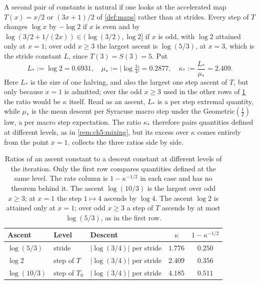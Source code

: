 A second pair of constants is natural if one looks at the accelerated map
$T(x)=x/2$ or $(3x+1)/2$ of \cref{def:maps} rather than at strides.  Every step
of $T$ changes $\log x$ by $-\log 2$ if $x$ is even and by
$\log(3/2+1/(2x))\in(\log(3/2),\log2]$ if $x$ is odd, with $\log 2$ attained
only at $x=1$; over odd $x\ge3$ the largest ascent is $\log(5/3)$, at $x=3$, which is the stride constant $L$, since $T(3)=S(3)=5$.
Put
\begin{equation}\label{eq:ch5:star}
  L_\ast:=\log 2=0.6931,\quad
  \mu_\ast:=\bigl|\log\tfrac34\bigr|=0.2877,\quad
  \kappa_\ast:=\frac{L_\ast}{\mu_\ast}=2.409 .
\end{equation}
Here $L_\ast$ is the size of one halving, and also the largest one step ascent of $T$, but only because $x=1$ is admitted; over the odd $x\ge3$ used in the other rows of \cref{tab:ch5:levels} the ratio would be $\kappa$ itself.
Read as an ascent, $L_\ast$ is a per step extremal
quantity, while $\mu_\ast$ is the mean descent per Syracuse macro step under
the Geometric$(\tfrac12)$ law, a per macro step expectation.
The ratio $\kappa_\ast$ therefore pairs quantities defined at different levels, as in \cref{rem:ch5:mixing}, but its excess over $\kappa$ comes entirely from the point $x=1$.
 collects the three ratios side by side.

\begin{table}[t]
\centering
\caption{Ratios of an ascent constant to a descent constant at different
levels of the iteration. Only the first row compares quantities defined at
the same level. The rate column is $1-\kappa^{-1/2}$ in each case and has no
theorem behind it. The ascent $\log(10/3)$ is the largest over odd $x\ge3$; at
$x=1$ the step $1\mapsto4$ ascends by $\log4$.
The ascent $\log2$ is attained only at $x=1$; over odd $x\ge3$ a step of $T$ ascends by at most $\log(5/3)$, as in the first row.}
\label{tab:ch5:levels}
\small\setlength{\tabcolsep}{4pt}
\begin{tabular}{lllcc}
\toprule
Ascent & Level & Descent & $\kappa$ & $1-\kappa^{-1/2}$\\
\midrule
$\log(5/3)$ & stride & $|\log(3/4)|$ per stride & $1.776$ & $0.250$\\
$\log 2$ & step of $T$ & $|\log(3/4)|$ per stride & $2.409$ & $0.356$\\
$\log(10/3)$ & step of $T_0$ & $|\log(3/4)|$ per stride & $4.185$ & $0.511$\\
\bottomrule
\end{tabular}
\end{table}


